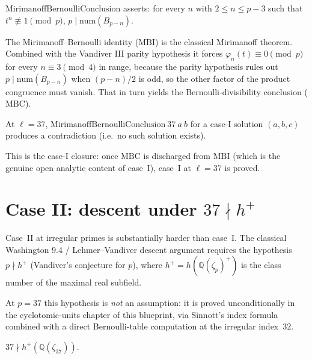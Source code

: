 \begin{definition}
  \label{def:mirimanoffBernoulliConclusion}
  \leanok
  $\mathrm{MirimanoffBernoulliConclusion}$ asserts: for every $n$ with
  $2 \le n \le p - 3$ such that $t^n \not\equiv 1 \pmod p$,
  $p \mid \mathrm{num}(B_{p-n})$.
\end{definition}

The Mirimanoff--Bernoulli identity ($\mathrm{MBI}$) is the classical
Mirimanoff theorem.  Combined with the Vandiver III parity hypothesis it
forces $\varphi_n(t) \equiv 0 \pmod p$ for every $n \equiv 3 \pmod 4$ in
range, because the parity hypothesis rules out
$p \mid \mathrm{num}(B_{p-n})$ when $(p-n)/2$ is odd, so the other factor
of the product congruence must vanish.  That in turn yields the
Bernoulli-divisibility conclusion ($\mathrm{MBC}$).

\begin{theorem}
  \label{thm:caseI_thirtyseven_of_bernoulli_conclusion}
  \leanok
  At $\ell = 37$, $\mathrm{MirimanoffBernoulliConclusion}\ 37\ a\ b$ for a
  case-I solution $(a,b,c)$ produces a contradiction (i.e.\ no such
  solution exists).
\end{theorem}

This is the case-I closure: once $\mathrm{MBC}$ is discharged from
$\mathrm{MBI}$ (which is the genuine open analytic content of case~I),
case~I at $\ell = 37$ is proved.

\section{Case II: descent under $37 \nmid h^+$}

Case~II at irregular primes is substantially harder than case~I.  The
classical Washington 9.4 / Lehmer--Vandiver descent argument requires
the hypothesis $p \nmid h^+$ (Vandiver's conjecture for $p$), where
$h^+ = h(\mathbb Q(\zeta_p)^+)$ is the class number of the maximal real
subfield.

At $p = 37$ this hypothesis is \emph{not} an assumption: it is proved
unconditionally in the cyclotomic-units chapter of this blueprint, via
Sinnott's index formula combined with a direct Bernoulli-table
computation at the irregular index~$32$.

\begin{theorem}
  \label{thm:flt37_not_dvd_hPlus}
  \leanok
  $37 \nmid h^+(\mathbb Q(\zeta_{37}))$.
\end{theorem}

